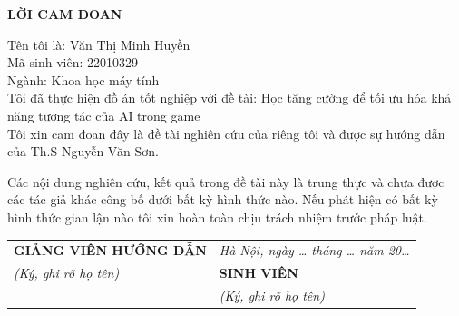 \begin{center}
    {\large\bfseries LỜI CAM ĐOAN}
\end{center}

\vspace{0.5cm}

\noindent Tên tôi là: Văn Thị Minh Huyền \\
\noindent Mã sinh viên: 22010329\\
\noindent Ngành: Khoa học máy tính\\
\noindent Tôi đã thực hiện đồ án tốt nghiệp với đề tài: Học tăng cường để tối ưu hóa khả năng tương tác của AI trong game
\noindent\\
\indent Tôi xin cam đoan đây là đề tài nghiên cứu của riêng tôi và được sự hướng dẫn
của Th.S Nguyễn Văn Sơn.

\indent Các nội dung nghiên cứu, kết quả trong đề tài này là trung thực và chưa được
các tác giả khác công bố dưới bất kỳ hình thức nào. Nếu phát hiện có bất kỳ hình thức
gian lận nào tôi xin hoàn toàn chịu trách nhiệm trước pháp luật.

\vspace{1.5cm}

\noindent
\begin{tabular}{p{} p{}}
    \textbf{GIẢNG VIÊN HƯỚNG DẪN}  &  \textit{Hà Nội, ngày \ldots{} tháng \ldots{} năm 20\ldots} \\[0.2cm]
    \quad\quad\textit{(Ký, ghi rõ họ tên)}    &  \quad\quad\quad\quad\textbf{SINH VIÊN}                                          \\[0.0cm]
                                    &  \quad\quad\quad\textit{(Ký, ghi rõ họ tên)}
\end{tabular}
